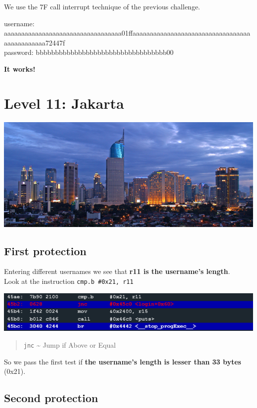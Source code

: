 \documentclass[a4paper,11pt]{article}
\begin{document}
We use the 7F call interrupt technique of the previous challenge.

username:
aaaaaaaaaaaaaaaaaaaaaaaaaaaaaaaaaa01ffaaaaaaaaaaaaaaaaaaaaaaaaaaaaaaaaaaaaaaaaaaaaaa72447f\\password:
bbbbbbbbbbbbbbbbbbbbbbbbbbbbbbbbbb00

\textbf{It works!}

\section{Level 11: Jakarta}\label{level-11-jakarta}

\includegraphics{img/11_6.PNG}

\subsection{First protection}\label{first-protection-1}

Entering different usernames we see that \textbf{r11 is the username's
length}.\\Look at the instruction \texttt{cmp.b \#0x21, r11}

\includegraphics{img/11_1.PNG}

\begin{quote}
\texttt{jnc} \textasciitilde{} Jump if Above or Equal
\end{quote}

So we pass the first test if \textbf{the username's length is lesser
than 33 bytes} (0x21).

\subsection{Second protection}\label{second-protection-1}
\end{document}
